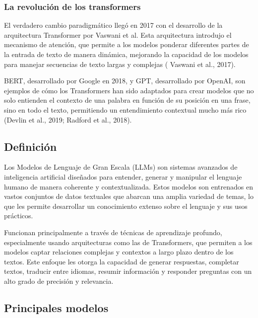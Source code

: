 \subsubsection*{La revolución de los transformers}
El verdadero cambio paradigmático llegó en 2017 con el desarrollo de la arquitectura
Transformer por Vaswani et al.
Esta arquitectura introdujo el mecanismo de atención, que permite a los modelos ponderar diferentes partes de la entrada
de texto de manera dinámica, mejorando la capacidad de los modelos para manejar secuencias de texto largas y complejas (
Vaswani et al., 2017).


BERT, desarrollado por Google en 2018, y GPT, desarrollado por OpenAI, son ejemplos de
cómo los Transformers han sido adaptados para crear modelos que
no solo entienden el contexto de una palabra en función de su posición en una frase, sino en todo
el texto, permitiendo un entendimiento contextual mucho más rico (Devlin et al., 2019; Radford et al., 2018).

\subsection{Definición}
Los Modelos de Lenguaje de Gran Escala (LLMs) son sistemas
avanzados de inteligencia artificial diseñados para entender, generar y
manipular el lenguaje humano de manera coherente y contextualizada. Estos
modelos son entrenados en vastos conjuntos de datos textuales que abarcan una amplia variedad de temas, lo que les
permite desarrollar un conocimiento extenso sobre el lenguaje y sus usos prácticos.

Funcionan principalmente a través de técnicas de aprendizaje
profundo, especialmente usando arquitecturas como las de Transformers,
que permiten a los modelos captar relaciones complejas y contextos a largo plazo dentro de los textos. Este enfoque les
otorga la capacidad de generar respuestas, completar textos,
traducir entre idiomas, resumir información y responder preguntas con un alto grado de precisión y relevancia.

\subsection{Principales modelos}


